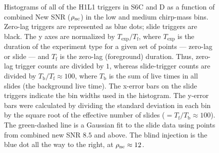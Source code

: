 \begin{figure}[p]
\center
{}
\caption{Histograms of all of the H1L1 triggers in S6C and D as a function of
combined New SNR ($\rho_{\mathrm{nc}}$) in the low and medium chirp-mass bins. Zero-lag
triggers are represented as blue dots; slide triggers are black. The y axes are
normalized by $T_{\mathrm{exp}}/T_{\mathrm{f}}$, where $T_{\mathrm{exp}}$ is
the duration of the experiment type for a given set of points --- zero-lag or
slide --- and $T_{\mathrm{f}}$ is the zero-lag (foreground) duration. Thus,
zero-lag trigger counts are divided by $1$, whereas slide-trigger counts are
divided by $T_{\mathrm{b}}/T_{\mathrm{f}} \approx 100$, where $T_{\mathrm{b}}$
is the sum of live times in all slides (the background live time). The x-error
bars on the slide triggers indicate the bin widths used in the histogram. The
y-error bars were calculated by dividing the standard deviation in each bin by
the square root of the effective number of slides ($=
T_{\mathrm{f}}/T_{\mathrm{b}} \approx 100$). The green-dashed line is a
Gaussian fit to the slide data using points from combined new SNR $8.5$ and
above. The blind injection is the blue dot all the way to the right, at
$\rho_{\mathrm{nc}} \approx 12$.}
\label{fig:big_dog-non_cum_hist-extrap}
\end{figure}

